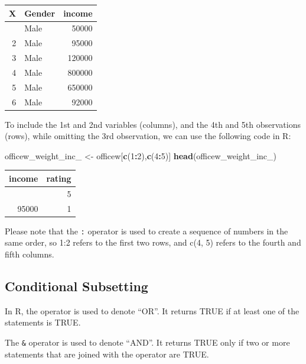 \documentclass[
]{article}
\newenvironment{Shaded}{\begin{snugshade}}{\end{snugshade}}
\newcommand{\DecValTok}[1]{\textcolor[rgb]{0.00,0.00,0.81}{#1}}
\newcommand{\FunctionTok}[1]{\textcolor[rgb]{0.13,0.29,0.53}{\textbf{#1}}}
\newcommand{\NormalTok}[1]{#1}
\newcommand{\OtherTok}[1]{\textcolor[rgb]{0.56,0.35,0.01}{#1}}
\newcommand{\SpecialCharTok}[1]{\textcolor[rgb]{0.81,0.36,0.00}{\textbf{#1}}}
\begin{document}
\begin{longtable}[]{@{}rlr@{}}
\toprule\noalign{}
X & Gender & income \\
\midrule\noalign{}
\endhead
\bottomrule\noalign{}
\endlastfoot
1 & Male & 50000 \\
2 & Male & 95000 \\
3 & Male & 120000 \\
4 & Male & 800000 \\
5 & Male & 650000 \\
6 & Male & 92000 \\
\end{longtable}

To include the 1st and 2nd variables (columns), and the 4th and 5th
observations (rows), while omitting the 3rd observation, we can use the
following code in R:

\begin{Shaded}
\begin{Highlighting}[]
\NormalTok{officew\_weight\_inc\_ }\OtherTok{\textless{}{-}}\NormalTok{ officew[}\FunctionTok{c}\NormalTok{(}\DecValTok{1}\SpecialCharTok{:}\DecValTok{2}\NormalTok{),}\FunctionTok{c}\NormalTok{(}\DecValTok{4}\SpecialCharTok{:}\DecValTok{5}\NormalTok{)]}
\FunctionTok{head}\NormalTok{(officew\_weight\_inc\_)}
\end{Highlighting}
\end{Shaded}

\begin{longtable}[]{@{}rr@{}}
\toprule\noalign{}
income & rating \\
\midrule\noalign{}
\endhead
\bottomrule\noalign{}
\endlastfoot
50000 & 5 \\
95000 & 1 \\
\end{longtable}

Please note that the \texttt{:} operator is used to create a sequence of
numbers in the same order, so 1:2 refers to the first two rows, and c(4,
5) refers to the fourth and fifth columns.

\hypertarget{conditional-subsetting}{%
\subsection{Conditional Subsetting}\label{conditional-subsetting}}

In R, the \texttt{\textbar{}} operator is used to denote ``OR''. It
returns TRUE if at least one of the statements is TRUE.

The \texttt{\&} operator is used to denote ``AND''. It returns TRUE only
if two or more statements that are joined with the operator are TRUE.
\end{document}
